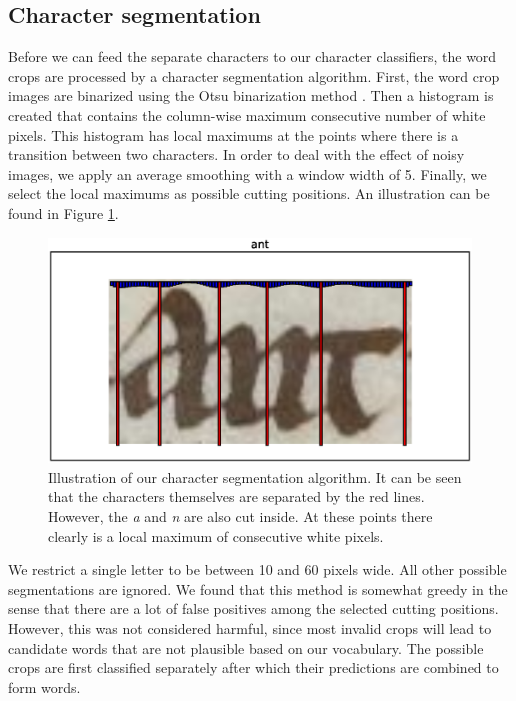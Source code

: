 \subsection{Character segmentation}
\label{sec:charseg}
Before we can feed the separate characters to our character classifiers, the word crops are processed by a character segmentation algorithm. First, the word crop images are binarized using the Otsu binarization method \cite{otsu1975threshold}. Then a histogram is created that contains the column-wise maximum consecutive number of white pixels. This histogram has local maximums at the points where there is a transition between two characters. In order to deal with the effect of noisy images, we apply an average smoothing with a window width of 5. Finally, we select the local maximums as possible cutting positions. An illustration can be found in Figure \ref{fig:char_seg}.

\begin{figure}
 \centering
 \includegraphics[width=.5\textwidth,trim={3cm 3cm 3cm 3cm},clip]{figures/char_segmentation.eps}
 \caption{Illustration of our character segmentation algorithm. It can be seen that the characters themselves are separated by the red lines. However, the \textit{a} and \textit{n} are also cut inside. At these points there clearly is a local maximum of consecutive white pixels.}
 \label{fig:char_seg}
\end{figure}

We restrict a single letter to be between 10 and 60 pixels wide. All other possible segmentations are ignored. We found that this method is somewhat greedy in the sense that there are a lot of false positives among the selected cutting positions. However, this was not considered harmful, since most invalid crops will lead to candidate words that are not plausible based on our vocabulary. The possible crops are first classified separately after which their predictions are combined to form words.